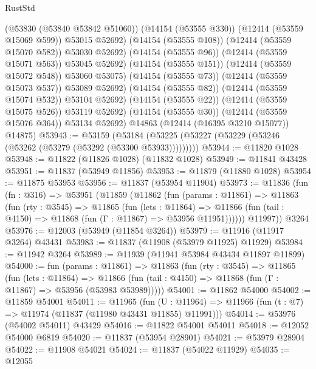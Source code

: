 \begin{lexlean}{RustStd}
\begin{coremodule}
                      (@53830 (@53840 @53842 @51060))
                      (@14154 (@53555 @330))
                      (@12414 (@53559 @15069 @599))
                      @53015
                      @52692)
                    (@14154 (@53555 @108))
                    (@12414 (@53559 @15070 @582))
                    @53030
                    @52692)
                  (@14154 (@53555 @96))
                  (@12414 (@53559 @15071 @563))
                  @53045
                  @52692)
                (@14154 (@53555 @151))
                (@12414 (@53559 @15072 @548))
                @53060
                @53075)
              (@14154 (@53555 @73))
              (@12414 (@53559 @15073 @537))
              @53089
              @52692)
            (@14154 (@53555 @82))
            (@12414 (@53559 @15074 @532))
            @53104
            @52692)
          (@14154 (@53555 @22))
          (@12414 (@53559 @15075 @526))
          @53119
          @52692)
        (@14154 (@53555 @30))
        (@12414 (@53559 @15076 @364))
        @53134
        @52692)
      @14863
      (@12414 (@16395 @3210 @15077))
      @14875)
@53943 := @53159
    (@53184 (@53225 (@53227 (@53229 (@53246 (@53262 (@53279 (@53292 (@53300 @53933)))))))))
@53944 := @11820 @1028
@53948 := @11822 (@11826 @1028) (@11832 @1028)
@53949 := @11841 @43428
@53951 := @11837 (@53949 @11856)
@53953 := @11879 (@11880 @1028)
@53954 := @11875 @53953
@53956 := @11837 (@53954 @11904)
@53973 := @11836
    (fun (fn : @316) =>
    @53951
      (@11859
        (@11862
          (fun (params : @11861) =>
          @11863
            (fun (rty : @3545) =>
            @11865
              (fun (lets : @11864) =>
              @11866 (fun (tail : @4150) => @11868 (fun (Γ : @11867) => @53956 @11951))))))
        @11997))
    @3264
@53976 := @12003 (@53949 (@11854 @3264))
@53979 := @11916 (@11917 @3264) @43431
@53983 := @11837 (@11908 (@53979 @11925) @11929)
@53984 := @11942 @3264
@53989 := @11939 (@11941 @53984 @43434 @11897 @11899)
@54000 := fun (params : @11861) =>
  @11863
    (fun (rty : @3545) =>
    @11865
      (fun (lets : @11864) =>
      @11866 (fun (tail : @4150) => @11868 (fun (Γ : @11867) => @53956 (@53983 @53989)))))
@54001 := @11862 @54000
@54002 := @11859 @54001
@54011 := @11965
    (fun (U : @11964) => @11966 (fun (t : @7) => @11974 (@11837 (@11980 @43431 @11855) @11991)))
@54014 := @53976 (@54002 @54011) @43429
@54016 := @11822 @54001 @54011
@54018 := @12052 @54000 @6819
@54020 := @11837 (@53954 @28901)
@54021 := @53979 @28904
@54022 := @11908 @54021
@54024 := @11837 (@54022 @11929)
@54035 := @12055

\end{coremodule}
\end{lexlean}
